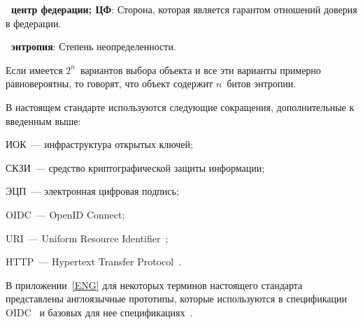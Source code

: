 

{\bf \thedefctr~центр федерации; ЦФ}:
Сторона, которая является гарантом отношений доверия в федерации.


{\bf \thedefctr~энтропия}:
Степень неопределенности. 

\begin{note*}
Если имеется $2^n$~вариантов выбора объекта и все эти варианты примерно
равновероятны, то говорят, что объект содержит $n$~битов энтропии.
\end{note*}

В настоящем стандарте используются следующие сокращения, дополнительные к 
введенным выше:

ИОК~--- инфраструктура открытых ключей;

СКЗИ~--- средство криптографической защиты информации;

ЭЦП~--- электронная цифровая подпись;

OIDC~--- OpenID Connect;

URI~--- Uniform Resource Identifier~\cite{RFC3986};

HTTP~--- Hypertext Transfer Protocol~\cite{RFC3986}.

В приложении~\ref{ENG} для некоторых терминов настоящего стандарта представлены
англоязычные прототипы, которые используются в спецификации OIDC~\cite{OIDC} и
базовых для нее спецификациях~\cite{RFC6749,RFC6750}.

